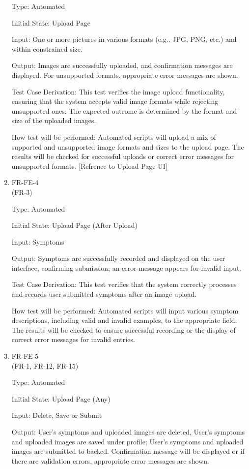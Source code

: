 \documentclass[12pt, titlepage]{article}
\begin{document}
\begin{enumerate}
Type: Automated
					
Initial State: Upload Page 
					
Input: One or more pictures in various formats (e.g., JPG, PNG, etc.) and within constrained size.
					
Output: Images are successfully uploaded, and confirmation messages are displayed. For unsupported formats, appropriate error messages are shown.

Test Case Derivation: This test verifies the image upload functionality, ensuring that the system accepts valid image formats while rejecting unsupported ones. The expected outcome is determined by the format and size of the uploaded images.

How test will be performed: Automated scripts will upload a mix of supported and unsupported image formats and sizes to the upload page. The results will be checked for successful uploads or correct error messages for unsupported formats.
[Refrence to Upload Page UI]

\item{FR-FE-4\\} (FR-3)

Type: Automated
					
Initial State: Upload Page (After Upload)
					
Input: Symptoms
					
Output: Symptoms are successfully recorded and displayed on the user interface, confirming submission; an error message appears for invalid input.

Test Case Derivation: This test verifies that the system correctly processes and records user-submitted symptoms after an image upload.

How test will be performed: Automated scripts will input various symptom descriptions, including valid and invalid examples, to the appropriate field. The results will be checked to ensure successful recording or the display of correct error messages for invalid entries.

\item{FR-FE-5\\} (FR-1, FR-12, FR-15)

Type: Automated
					
Initial State: Upload Page (Any)
					
Input: Delete, Save or Submit
					
Output: User’s symptoms and uploaded images are deleted, User’s symptoms and uploaded images are saved under profile; User's symptoms and uploaded images are submitted to backed. Confirmation message will be displayed or if there are validation errors, appropriate error messages are shown.


\end{enumerate}
\end{document}
